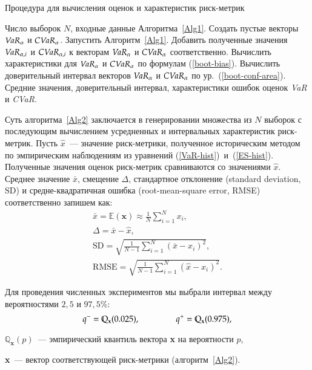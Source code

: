 \begin{algorithm}[!t]
\caption{Процедура для вычисления оценок и характеристик риск-метрик}
\label{Alg2}
\begin{algorithmic}[1]
	\Require Число выборок $N$, входные данные Алгоритма~\ref{Alg1}. %
	    \State Создать пустые векторы $\emph{VaR}_\alpha$ и $\emph{CVaR}_\alpha$.
	    \State Запустить Алгоритм~\ref{Alg1}.
	    \State Добавить полученные значения $\emph{VaR}_{\alpha, i}$ и $\emph{CVaR}_{\alpha, i}$ к векторам $\emph{VaR}_\alpha$ и $\emph{CVaR}_\alpha$ соответственно.
	\EndFor
	\State Вычислить характеристики для $\emph{VaR}_\alpha$ и $\emph{CVaR}_\alpha$ по формулам (\ref{boot-bias}).
	\State Вычислить доверительный интервал векторов $\emph{VaR}_\alpha$ и $\emph{CVaR}_\alpha$ по ур.~(\ref{boot-conf-area}).
	\Ensure Средние значения, доверительный интервал, характеристики ошибок оценок \textit{VaR} и \textit{CVaR}.
\end{algorithmic}
\end{algorithm}

Суть алгоритма~\ref{Alg2} заключается в генерировании множества из $N$ выборок с последующим вычислением усредненных и интервальных характеристик риск-метрик. 
Пусть $\hat{x}$~--- значение риск-метрики, полученное историческим методом по эмпирическим наблюдениям из уравнений (\ref{VaR-hist})~и~(\ref{ES-hist}).
Полученные значения оценок риск-метрик сравниваются со значениями $\hat{x}$.
Среднее значение $\bar{x}$, смещение $\Delta$, стандартное отклонение (standard deviation, SD) и средне-квадратичная ошибка (root-mean-square error, RMSE) соответственно запишем как:
\begin{gather}
\bar{x} = \mathbb{E} (\textbf{x}) \approx \frac{1}{N} \sum_{i=1}^N x_i,\label{boot-mean} \\
\Delta = \bar{x} - \hat{x}, \label{boot-bias}\nonumber \\
\text{SD} = \sqrt{\frac{1}{N-1} \sum_{i=1}^N (\bar{x} - x_i)^2},\label{boot-sd}\nonumber\\
\text{RMSE} = \sqrt{\frac{1}{N-1} \sum_{i=1}^N (\hat{x} - x_i)^2}.\label{boot-rmse}\nonumber
\end{gather}

Для проведения  численных экспериментов мы выбрали интервал между вероятностями $2,5$ и $97,5\%$:
\begin{equation} \label{boot-conf-area}
    q^- = \mathbb{Q}_{\textbf{x}} (0.025), 
    \hspace{1.5cm}
    q^+ = \mathbb{Q}_{\textbf{x}} (0.975),
\end{equation}
\begin{where}
    \item $\mathbb{Q}_{\textbf{x}} (p)$~--- эмпирический квантиль вектора \textbf{x} на вероятности $p$,
    \item \textbf{x}~--- вектор соответствующей риск-метрики (алгоритм~\ref{Alg2}).
\end{where}

